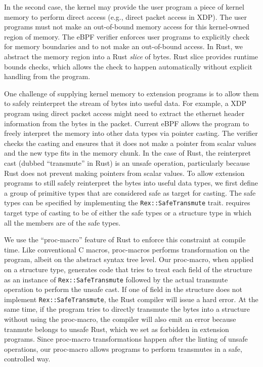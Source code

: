 In the second case, the kernel may provide the user program a piece of kernel
    memory to perform direct access (e.g., direct packet access in XDP).
The user programs must not make an out-of-bound memory access for this
    kernel-owned region of memory.
The eBPF verifier enforces user programs to explicitly check for memory
    boundaries and to not make an out-of-bound access.
In Rust, we abstract the memory region into a Rust \textit{slice} of bytes.
Rust slice provides runtime bounds checks, which allows the check to happen
    automatically without explicit handling from the program.

One challenge of supplying kernel memory to extension programs is to allow them
    to safely reinterpret the stream of bytes into useful data.
For example, a XDP program using direct packet access might need to extract
    the ethernet header information from the bytes in the packet.
Current eBPF allows the program to freely interpret the memory into other
    data types via pointer casting.
The verifier checks the casting and ensures that it does not make a pointer
    from scalar values and the new type fits in the memory chunk.
In the case of Rust, the reinterpret cast (dubbed ``transmute'' in Rust) is an
    unsafe operation, particularly because Rust does not prevent making
    pointers from scalar values.
To allow extension programs to still safely reinterpret the bytes into useful
    data types, we first define a group of primitive types that are considered
    safe as target for casting.
The safe types can be specified by implementing the \texttt{Rex::SafeTransmute}
    trait.
\projname{} requires target type of casting to be of either the safe types or a
    structure type in which all the members are of the safe types.

We use the ``proc-macro'' feature of Rust to enforce this constraint at compile
    time.
Like conventional C macros, proc-macros performs transformation on the program,
    albeit on the abstract syntax tree level.
Our proc-macro, when applied on a structure type, generates code that tries
    to treat each field of the structure as an instance of
    \texttt{Rex::SafeTransmute} followed by the actual transmute operation to
    perform the unsafe cast.
If one of field in the structure does not implement \texttt{Rex::SafeTransmute},
    the Rust compiler will issue a hard error.
At the same time, if the program tries to directly transmute the bytes into a
    structure without using the proc-macro, the compiler will also emit an
    error because tranmute belongs to unsafe Rust, which we set as forbidden
    in extension programs.
Since proc-macro transformations happen after the linting of unsafe operations,
    our proc-macro allows programs to perform transmutes in a safe, controlled
    way.

